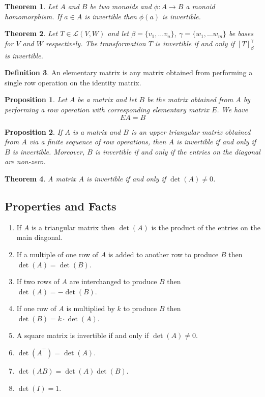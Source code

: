 \documentclass[12pt,letterpaper]{article}
\theoremstyle{plain}
\newtheorem{theorem}{Theorem}[section]
\newtheorem{proposition}{Proposition}[section]
\theoremstyle{definition}
\newtheorem{definition}[theorem]{Definition}
\numberwithin{equation}{section}
\begin{document}
\begin{theorem}
Let $A$ and $B$ be two monoids and $\phi:A\rightarrow B$ a monoid homomorphism. If $a\in A$ is invertible then $\phi(a)$ is invertible. 
\end{theorem}


\begin{theorem}\label{matinv}
Let $T\in \mathcal{L}(V,W)$ and let $\beta=\{v_1,\ldots v_n\}$, $\gamma=\{w_1, \ldots w_m\}$ be bases for $V$ and $W$ respectively. The transformation $T$ is invertible if and only if $[T]_\beta^\gamma$ is invertible.
\end{theorem}

\begin{definition}
An elementary matrix is any matrix obtained from performing a single row operation on the identity matrix. 
\end{definition}


\begin{proposition} Let $A$ be a matrix and let $B$ be the matrix obtained from $A$ by performing a row operation with corresponding elementary matrix $E$. We have 
\[EA=B\]
\end{proposition}


\begin{proposition}If $A$ is a matrix and $B$ is an upper triangular matrix obtained from $A$ via a finite sequence of row operations, then $A$ is invertible if and only if $B$ is invertible. Moreover, $B$ is invertible if and only if the entries on the diagonal are non-zero. 
\end{proposition}


\begin{theorem} A matrix $A$ is invertible if and only if $\det(A)\neq 0$. 
\end{theorem}

\subsection{Properties and Facts}
\begin{enumerate}[$\bullet$]
\item If $A$ is a triangular matrix then $\det(A)$ is the product of the entries on the main diagonal.
\item If a multiple of one row of $A$ is added to another row to produce $B$ then $\det(A)=\det(B)$.
\item If two rows of $A$ are interchanged to produce $B$ then $\det(A)=-\det(B)$. 
\item If one row of $A$ is multiplied by $k$ to produce $B$ then $\det(B)=k\cdot \det(A)$. 
\item A square matrix is invertible if and only if $\det(A)\neq 0$.
\item $\det(A^\top)=\det(A)$. 
\item $\det(AB)=\det(A)\det(B)$.
\item $\det(I)=1$.
\end{enumerate}
\end{document}
